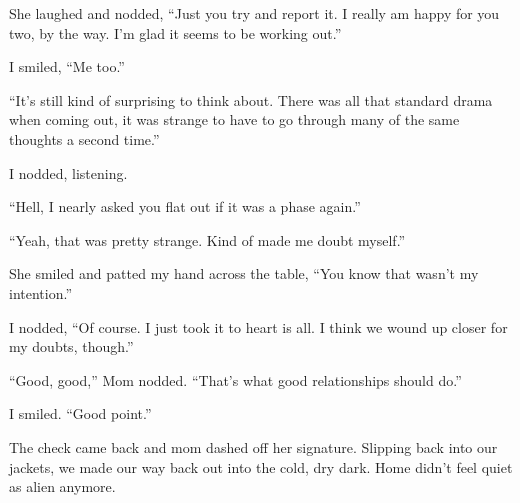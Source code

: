She laughed and nodded, ``Just you try and report it.  I really am happy for you two, by the way.  I'm glad it seems to be working out.''

I smiled, ``Me too.''

``It's still kind of surprising to think about.  There was all that standard drama when coming out, it was strange to have to go through many of the same thoughts a second time.''

I nodded, listening.

``Hell, I nearly asked you flat out if it was a phase again.''

``Yeah, that was pretty strange.  Kind of made me doubt myself.''

She smiled and patted my hand across the table, ``You know that wasn't my intention.''

I nodded, ``Of course.  I just took it to heart is all.  I think we wound up closer for my doubts, though.''

``Good, good,'' Mom nodded.  ``That's what good relationships should do.''

I smiled.  ``Good point.''

The check came back and mom dashed off her signature.  Slipping back into our jackets, we made our way back out into the cold, dry dark.  Home didn't feel quiet as alien anymore. 
